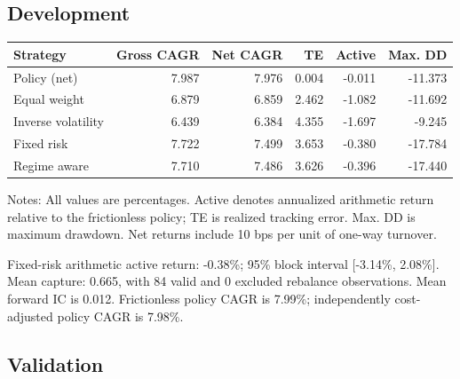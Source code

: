\documentclass[11pt,a4paper]{article}
\begin{document}
\subsection{Development}

\begin{center}\begin{minipage}{\textwidth}\small
{}\label{tab-development}
\begin{tabular*}{\textwidth}{@{\extracolsep{\fill}}lrrrrr@{}}\toprule Strategy & Gross CAGR & Net CAGR & TE & Active & Max. DD\\\midrule

Policy (net) & 7.987 & 7.976 & 0.004 & -0.011 & -11.373\\

Equal weight & 6.879 & 6.859 & 2.462 & -1.082 & -11.692\\

Inverse volatility & 6.439 & 6.384 & 4.355 & -1.697 & -9.245\\

Fixed risk & 7.722 & 7.499 & 3.653 & -0.380 & -17.784\\

Regime aware & 7.710 & 7.486 & 3.626 & -0.396 & -17.440\\

\bottomrule\end{tabular*}\par\vspace{4pt}\footnotesize\noindent Notes: All values are percentages. Active denotes annualized arithmetic return relative to the frictionless policy; TE is realized tracking error. Max. DD is maximum drawdown. Net returns include 10 bps per unit of one-way turnover.\end{minipage}\end{center}

Fixed-risk arithmetic active return: -0.38\%; 95\% block interval [-3.14\%, 2.08\%]. Mean capture: 0.665, with 84 valid and 0 excluded rebalance observations. Mean forward IC is 0.012. Frictionless policy CAGR is 7.99\%; independently cost-adjusted policy CAGR is 7.98\%.

\subsection{Validation}
\end{document}
